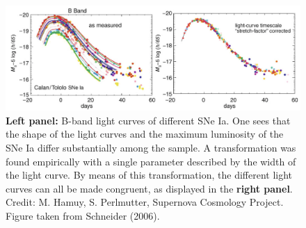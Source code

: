 \documentclass[a4paper,10pt]{article}
\begin{document}
\begin{figure}[t]
    \centering
    \includegraphics[width=16cm]{figures/SNeIa_corrected.png}
    \caption{\footnotesize{\textbf{Left panel:} B-band light curves of different SNe Ia. One sees that the shape of the light curves and the maximum luminosity of the SNe Ia differ substantially among the sample. A transformation was found empirically with a single parameter described by the width of the light curve. By means of this transformation, the different light curves can all be made congruent, as displayed in the \textbf{right panel}. Credit: M. Hamuy, S. Perlmutter, Supernova Cosmology Project. Figure taken from Schneider (2006).}}
    \label{fig:sneia_corrected}
\end{figure}
\end{document}
